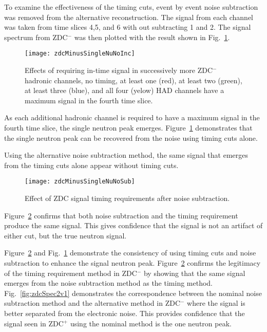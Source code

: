       To examine the effectiveness of the timing cuts, event by event noise 
        subtraction was removed from the alternative reconstruction.
      The signal from each channel was taken from time slices 4,5, and 6 with
        out subtracting 1 and 2.
      The signal spectrum from ZDC$^{-}$ was then plotted with the result
        shown in Fig.~\ref{fig:zdcTimingCuts}.
      \begin{figure}[!Hhbt]
        \centering
        \texttt{[image: zdcMinusSingleNuNoInc]}
        \caption{Effects of requiring in-time signal in successively more 
          ZDC$^{-}$ hadronic channels, no timing, at least one (red), at least two (green),
            at least three (blue), and all four (yelow) HAD channels have a maximum signal
            in the fourth time slice.}
        \label{fig:zdcTimingCuts}
      \end{figure}
      As each additional hadronic channel is required to have a maximum signal
        in the fourth time slice, the single neutron peak emerges. 
      Figure~\ref{fig:zdcTimingCuts} demonstrates that the single neutron peak 
        can be recovered from the noise using timing cuts alone. 

      Using the alternative noise subtraction method, the same signal that emerges
        from the timing cuts alone appear without timing cuts.
       \begin{figure}[h]
        \centering
        \texttt{[image: zdcMinusSingleNuNoSub]}
        \caption{Effect of ZDC signal timing requirements after noise 
          subtraction.}
        \label{fig:zdcTimingAfterNoiseSub}
      \end{figure}
      Figure~\ref{fig:zdcTimingAfterNoiseSub} confirms that both noise 
        subtraction and the timing requirement produce the same signal.
      This gives confidence that the signal is not an artifact of either cut, 
        but the true neutron signal.

      Figure~\ref{fig:zdcTimingAfterNoiseSub} and Fig.~\ref{fig:zdcTimingCuts} 
        demonstrate the consistency of using timing cuts and noise 
        subtraction to enhance the signal neutron peak. 
      Figure~\ref{fig:zdcTimingAfterNoiseSub} confirms the legitimacy of the 
        timing requirement method in ZDC$^{-}$ by showing that the same
        signal emerges from the noise subtraction method as the timing method.
      Fig.~\ref{fig:zdcSpec2v1} demonstrates the correspondence between
        the nominal noise subtraction method and the alternative method in 
        ZDC$^{-}$ where the signal is better separated from the electronic noise. 
      This provides confidence that the signal seen in ZDC$^{+}$ using 
        the nominal method is the one neutron peak.
